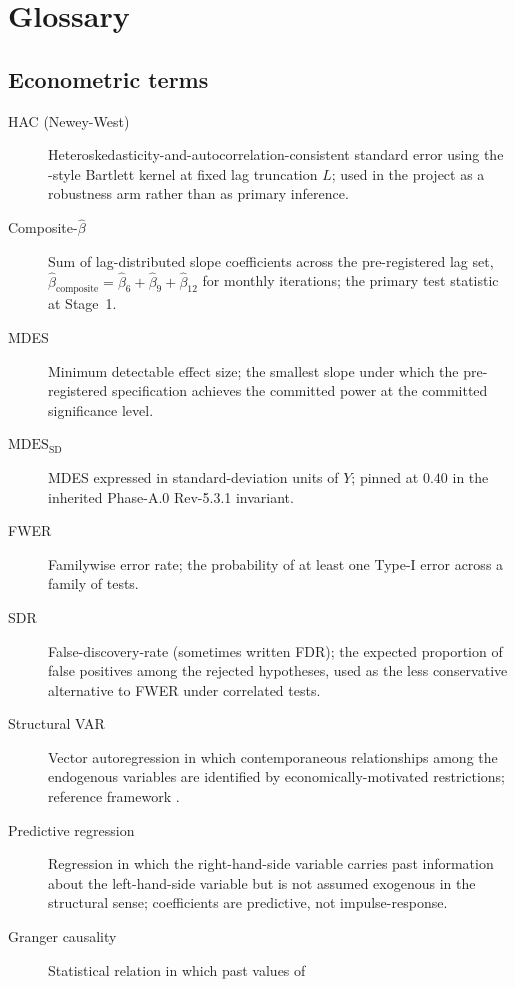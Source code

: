 \section{Glossary}\label{app:A}

\subsection*{Econometric terms}
\begin{description}
  \item[HAC (Newey-West)] Heteroskedasticity-and-autocorrelation-consistent
    standard error using the \citet{hansen_2022}-style Bartlett kernel at
    fixed lag truncation \(L\); used in the project as a robustness arm
    rather than as primary inference.
  \item[Composite-\(\hat{\beta}\)] Sum of lag-distributed slope
    coefficients across the pre-registered lag set,
    \(\hat{\beta}_{\text{composite}} = \hat{\beta}_{6} + \hat{\beta}_{9}
    + \hat{\beta}_{12}\) for monthly iterations; the primary test
    statistic at Stage~1.
  \item[MDES] Minimum detectable effect size; the smallest slope under
    which the pre-registered specification achieves the committed power
    at the committed significance level.
  \item[\(\mathrm{MDES}_{\mathrm{SD}}\)] MDES expressed in
    standard-deviation units of \(Y\); pinned at \(0.40\) in the
    inherited Phase-A.0 Rev-5.3.1 invariant.
  \item[FWER] Familywise error rate; the probability of at least one
    Type-I error across a family of tests.
  \item[SDR] False-discovery-rate (sometimes written FDR); the expected
    proportion of false positives among the rejected hypotheses, used as
    the less conservative alternative to FWER under correlated tests.
  \item[Structural VAR] Vector autoregression in which contemporaneous
    relationships among the endogenous variables are identified by
    economically-motivated restrictions; reference framework
    \citet{kilian_lutkepohl_2017}.
  \item[Predictive regression] Regression in which the right-hand-side
    variable carries past information about the left-hand-side variable
    but is not assumed exogenous in the structural sense; coefficients
    are predictive, not impulse-response.
  \item[Granger causality] Statistical relation in which past values of

\end{description}
